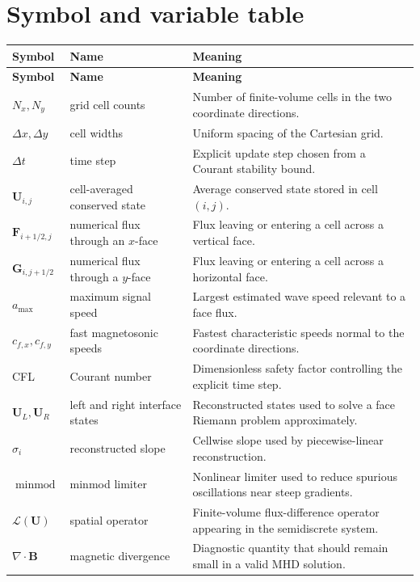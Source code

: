 \documentclass[11pt]{article}
\newcommand{\Uvec}{\mathbf{U}}
\newcommand{\Fvec}{\mathbf{F}}
\newcommand{\Gvec}{\mathbf{G}}
\newcommand{\Bvec}{\mathbf{B}}
\begin{document}
\section{Symbol and variable table}
\begin{longtable}{>{\raggedright\arraybackslash}p{} >{\raggedright\arraybackslash}p{} >{\raggedright\arraybackslash}p{}}
\toprule
\textbf{Symbol} & \textbf{Name} & \textbf{Meaning} \\
\midrule
\endfirsthead
\toprule
\textbf{Symbol} & \textbf{Name} & \textbf{Meaning} \\
\midrule
\endhead
$N_x,N_y$ & grid cell counts & Number of finite-volume cells in the two coordinate directions. \\
$\Delta x,\Delta y$ & cell widths & Uniform spacing of the Cartesian grid. \\
$\Delta t$ & time step & Explicit update step chosen from a Courant stability bound. \\
$\Uvec_{i,j}$ & cell-averaged conserved state & Average conserved state stored in cell $(i,j)$. \\
$\Fvec_{i+1/2,j}$ & numerical flux through an $x$-face & Flux leaving or entering a cell across a vertical face. \\
$\Gvec_{i,j+1/2}$ & numerical flux through a $y$-face & Flux leaving or entering a cell across a horizontal face. \\
$a_{\max}$ & maximum signal speed & Largest estimated wave speed relevant to a face flux. \\
$c_{f,x},c_{f,y}$ & fast magnetosonic speeds & Fastest characteristic speeds normal to the coordinate directions. \\
CFL & Courant number & Dimensionless safety factor controlling the explicit time step. \\
$\Uvec_L,\Uvec_R$ & left and right interface states & Reconstructed states used to solve a face Riemann problem approximately. \\
$\sigma_i$ & reconstructed slope & Cellwise slope used by piecewise-linear reconstruction. \\
$\operatorname{minmod}$ & minmod limiter & Nonlinear limiter used to reduce spurious oscillations near steep gradients. \\
$\mathcal{L}(\Uvec)$ & spatial operator & Finite-volume flux-difference operator appearing in the semidiscrete system. \\
$\nabla\cdot\Bvec$ & magnetic divergence & Diagnostic quantity that should remain small in a valid MHD solution. \\
\bottomrule
\end{longtable}
\end{document}
